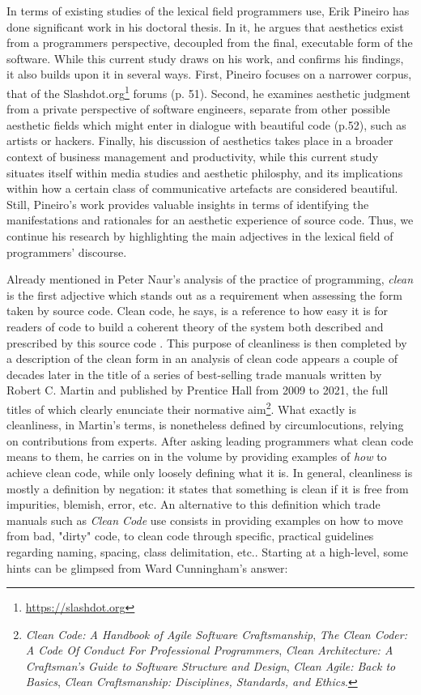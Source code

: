 In terms of existing studies of the lexical field programmers use, Erik Pineiro has done significant work in his doctoral thesis. In it, he argues that aesthetics exist from a programmers perspective, decoupled from the final, executable form of the software. While this current study draws on his work, and confirms his findings, it also builds upon it in several ways. First, Pineiro focuses on a narrower corpus, that of the Slashdot.org\footnote{\url{https://slashdot.org}} forums \citep{pineiro_aesthetics_2003} (p. 51). Second, he examines aesthetic judgment from a private perspective of software engineers, separate from other possible aesthetic fields which might enter in dialogue with beautiful code \citep{pineiro_aesthetics_2003} (p.52), such as artists or hackers. Finally, his discussion of aesthetics takes place in a broader context of business management and productivity, while this current study situates itself within media studies and aesthetic philosphy, and its implications within how a certain class of communicative artefacts are considered beautiful. Still, Pineiro's work provides valuable insights in terms of identifying the manifestations and rationales for an aesthetic experience of source code. Thus, we continue his research by highlighting the main adjectives in the lexical field of programmers' discourse.

Already mentioned in Peter Naur's analysis of the practice of programming, \emph{clean} is the first adjective which stands out as a requirement when assessing the form taken by source code. Clean code, he says, is a reference to how easy it is for readers of code to build a coherent theory of the system both described and prescribed by this source code \citep{naur_programming_1985}. This purpose of cleanliness is then completed by a description of the clean form in an analysis of clean code appears a couple of decades later in the title of a series of best-selling trade manuals written by Robert C. Martin and published by Prentice Hall from 2009 to 2021, the full titles of which clearly enunciate their normative aim\footnote{\emph{Clean Code: A Handbook of Agile Software Craftsmanship}, \emph{The Clean Coder: A Code Of Conduct For Professional Programmers}, \emph{Clean Architecture: A Craftsman's Guide to Software Structure and Design}, \emph{Clean Agile: Back to Basics}, \emph{Clean Craftsmanship: Disciplines, Standards, and Ethics}.}. What exactly is cleanliness, in Martin's terms, is nonetheless defined by circumlocutions, relying on contributions from experts. After asking leading programmers what clean code means to them, he carries on in the volume by providing examples of \emph{how} to achieve clean code, while only loosely defining what it is. In general, cleanliness is mostly a definition by negation: it states that something is clean if it is free from impurities, blemish, error, etc. An alternative to this definition which trade manuals such as \emph{Clean Code} use consists in providing examples on how to move from bad, "dirty" code, to clean code through specific, practical guidelines regarding naming, spacing, class delimitation, etc.. Starting at a high-level, some hints can be glimpsed from Ward Cunningham's answer:

